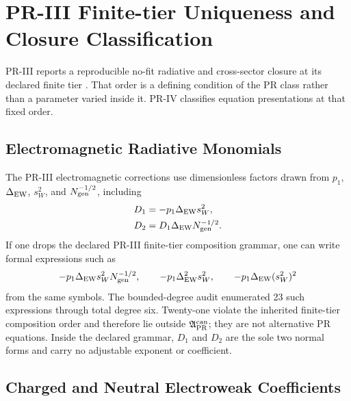 \section{PR-III Finite-tier Uniqueness and Closure Classification}
\label{sec:pr3-branch-countermodels}

PR-III reports a reproducible no-fit radiative and cross-sector closure at its declared finite tier \cite{PRIII}.  That order is a defining condition of the PR class rather than a parameter varied inside it.  PR-IV classifies equation presentations at that fixed order.

\subsection{Electromagnetic Radiative Monomials}

The PR-III electromagnetic corrections use dimensionless factors drawn from $p_1$, $\Delta_{\rm EW}$, $s_W^2$, and $N_{\rm gen}^{-1/2}$, including
\begin{align}
 D_1&=-p_1\Delta_{\rm EW}s_W^2,\\
 D_2&=D_1\Delta_{\rm EW}N_{\rm gen}^{-1/2}.
\end{align}
If one drops the declared PR-III finite-tier composition grammar, one can write formal expressions such as
\begin{equation}
 -p_1\Delta_{\rm EW}s_W^2N_{\rm gen}^{-1/2},
 \qquad
 -p_1\Delta_{\rm EW}^2s_W^2,
 \qquad
 -p_1\Delta_{\rm EW}(s_W^2)^2
 \label{eq:pr35-pr3-monomial-counterexamples}
\end{equation}
from the same symbols.  The bounded-degree audit enumerated 23 such expressions through total degree six.  Twenty-one violate the inherited finite-tier composition order and therefore lie outside
$\mathfrak A_{\rm PR}^{\rm can}$; they are not alternative PR equations. Inside the declared grammar, $D_1$ and $D_2$ are the sole two normal forms and carry no adjustable exponent or coefficient.

\subsection{Charged and Neutral Electroweak Coefficients}

